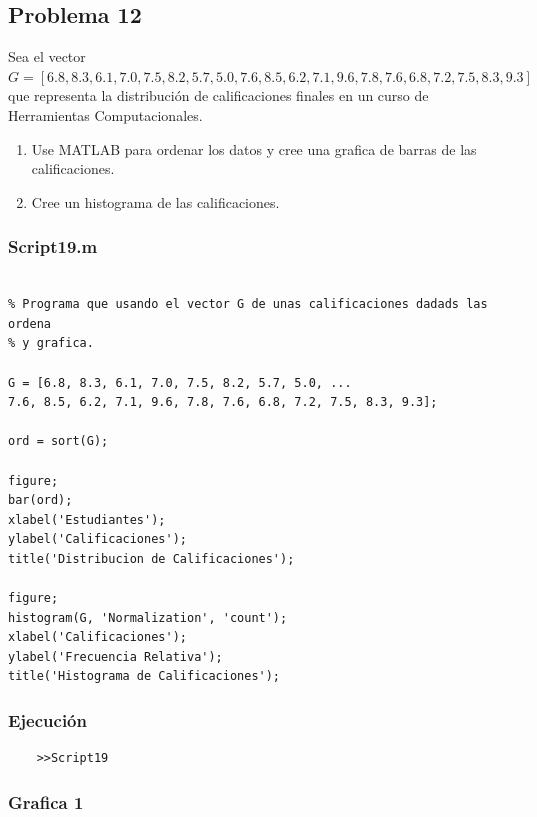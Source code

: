\documentclass{article}
\begin{document}
	\newpage
	
	\subsection{Problema 12}
	
	Sea el vector $G = [6.8, 8.3, 6.1, 7.0, 7.5, 8.2, 5.7, 5.0, 7.6, 8.5, 6.2, 7.1, 9.6, 7.8, 7.6, 6.8, 7.2, 7.5, 8.3, 9.3]$ que representa la distribución de calificaciones finales en un curso de Herramientas Computacionales.
	
	\begin{enumerate}
		\item Use MATLAB para ordenar los datos y cree una grafica de barras de las calificaciones.
		\item Cree un histograma de las calificaciones.
	\end{enumerate}
	
	\subsubsection{Script19.m}
	
	\begin{lstlisting}

% Programa que usando el vector G de unas calificaciones dadads las ordena
% y grafica.

G = [6.8, 8.3, 6.1, 7.0, 7.5, 8.2, 5.7, 5.0, ...
7.6, 8.5, 6.2, 7.1, 9.6, 7.8, 7.6, 6.8, 7.2, 7.5, 8.3, 9.3];

ord = sort(G);

figure;
bar(ord);
xlabel('Estudiantes');
ylabel('Calificaciones');
title('Distribucion de Calificaciones');

figure;
histogram(G, 'Normalization', 'count');
xlabel('Calificaciones');
ylabel('Frecuencia Relativa');
title('Histograma de Calificaciones');

	\end{lstlisting}
	
	\subsubsection{Ejecución}
	
	\begin{lstlisting}
	>>Script19
	\end{lstlisting}
	
	\newpage
	
	\subsubsection{Grafica 1}
	
\end{document}
